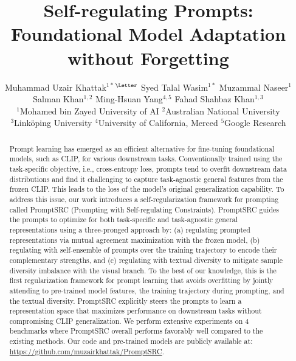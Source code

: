 \documentclass[10pt,twocolumn,letterpaper]{article}
\newcommand{\corrAuthor}{$^{\textrm{\Letter}}$}
\begin{document}
\title{Self-regulating Prompts: Foundational Model Adaptation without Forgetting}

\author{%
  Muhammad Uzair Khattak$^{1*}$\corrAuthor \quad 
  Syed Talal Wasim$^{1*}$ \quad 
  Muzammal Naseer$^{1}$ \\ 
  Salman Khan$^{1,2}$ \quad
  Ming-Hsuan Yang$^{4, 5}$ \quad
  Fahad Shahbaz Khan$^{1,3}$
  \vspace{0.5em} \\
  $^{1}$Mohamed bin Zayed University of AI \quad 
  $^{2}$Australian National University \\ 
  $^{3}$Link\"{o}ping University \quad 
  $^{4}$University of California, Merced \quad 
  $^{5}$Google Research
}


\maketitle
\ificcvfinal\thispagestyle{empty}\fi

\begin{abstract}
Prompt learning has emerged as an efficient alternative for fine-tuning foundational models, such as CLIP, for various downstream tasks. Conventionally trained using the task-specific objective, i.e., cross-entropy loss, prompts tend to overfit downstream data distributions and find it challenging to capture task-agnostic general features from the frozen CLIP. This leads to the loss of the model's original generalization capability. To address this issue, our work introduces a self-regularization framework for prompting called PromptSRC (Prompting with Self-regulating Constraints). PromptSRC guides the prompts to optimize for both task-specific and task-agnostic general representations using a three-pronged approach by: (a) regulating {prompted} representations via mutual agreement maximization with the frozen model, (b) regulating with self-ensemble of prompts over the training trajectory to encode their complementary strengths, and (c) regulating with textual diversity to mitigate sample diversity imbalance with the visual branch. To the best of our knowledge, this is the first regularization framework for prompt learning that avoids overfitting by jointly attending to pre-trained model features, the training trajectory during prompting, and the textual diversity. PromptSRC explicitly steers the prompts to learn a representation space that maximizes performance on downstream tasks without compromising CLIP generalization. We perform extensive experiments on 4 benchmarks where PromptSRC  {overall} performs favorably well compared to the existing methods. Our code and pre-trained models are publicly available at: \href{https://github.com/muzairkhattak/PromptSRC}{https://github.com/muzairkhattak/PromptSRC}.
\end{abstract}\vspace{-1em}
\end{document}
